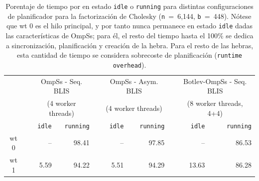 \begin{table}
\centering
	\caption{Porentaje de tiempo por \wt en estado {\tt idle} o {\tt running} para distintas configuraciones de planificador para la factorización de Cholesky
({\tt n}~=~6,144, {\tt b}~=~448).
	Nótese que {\sc wt 0} es el hilo principal, y por tanto nunca permanece en estado {\tt idle} dadas las características de OmpSs; 
	para él, el resto del tiempo hasta el 100\% se dedica a sincronización, planificación y creación de la hebra. Para el resto de las hebras, esta cantidad
	de tiempo se considera sobrecoste de planificación ({\tt runtime overhead}).}
\label{tab:th_state}

\ca{2pt}

\renewcommand{\fg}[1]{{#1}} 
\renewcommand{\br}[1]{{#1}} 

{\scriptsize
\begin{tabular}{crrrrrrrrr} 
   	\toprule
                 & \phantom{a} & \multicolumn{2}{c}{OmpSs - Seq. BLIS} & \phantom{ab} & \multicolumn{2}{c}{OmpSs - Asym. BLIS} & \phantom{ab} & \multicolumn{2}{c}{Botlev-OmpSs - Seq. BLIS} \\ 
                 & \phantom{a} & \multicolumn{2}{c}{(4 worker threads)} & \phantom{ab} & \multicolumn{2}{c}{(4 worker threads)} & \phantom{ab} & \multicolumn{2}{c}{(8 worker threads, 4+4)} \\ 
                                          \cmidrule{3-4}                                         \cmidrule{6-7}                                      \cmidrule{9-10}
                       & \phantom{a} &    {\tt idle}& {\tt running}& \phantom{ab}  & {\tt idle}& {\tt running}& \phantom{ab} & {\tt idle}  & {\tt running} \\ \hline 
	 {\sc wt 0}    & \phantom{a} &    \fg{--}   & \fg{98.41}   & \phantom{ab}  & \fg{--}   & \fg{97.85}   & \phantom{ab} & \fg{--}     & \fg{86.53}    \\ \cline{3-10}
	 {\sc wt 1}    & \phantom{a} &    \br{5.59} & \fg{94.22}   & \phantom{ab}  & \fg{5.51} & \fg{94.29}   & \phantom{ab} & \fg{13.63}  & \fg{86.28}    \\ \cline{3-10}

\end{tabular}}
\end{table}
